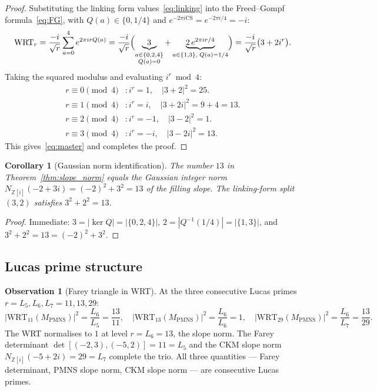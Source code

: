 \documentclass[11pt,a4paper]{article}
\newtheorem{corollary}[theorem]{Corollary}
\theoremstyle{definition}
\newtheorem{observation}[theorem]{Observation}
\newcommand{\MPMNS}{M_{\mathrm{PMNS}}}
\newcommand{\Zi}{\mathbb{Z}[i]}
\newcommand{\WRT}{\mathrm{WRT}}
\newcommand{\CS}{\mathrm{CS}}
\begin{document}
\begin{proof}
Substituting the linking form values~\eqref{eq:linking} into the
Freed--Gompf formula~\eqref{eq:FG}, with $Q(a) \in \{0, 1/4\}$ and
$e^{-2\pi i \CS} = e^{-2\pi i/4} = -i$:
\begin{equation*}
\WRT_r
= \frac{-i}{\sqrt{r}}\sum_{a=0}^{4} e^{2\pi i r Q(a)}
= \frac{-i}{\sqrt{r}}\Bigl(
  \underbrace{3}_{\substack{a \in \{0,2,4\}\\Q(a)=0}}
  +\underbrace{2\,e^{2\pi i r/4}}_{a \in \{1,3\},\;Q(a)=1/4}\Bigr)
= \frac{-i}{\sqrt{r}}\bigl(3 + 2i^r\bigr).
\end{equation*}
Taking the squared modulus and evaluating $i^r \bmod 4$:
\begin{align*}
r \equiv 0\pmod{4} &: i^r=1,\quad |3+2|^2=25.\\
r \equiv 1\pmod{4} &: i^r=i,\quad |3+2i|^2=9+4=13.\\
r \equiv 2\pmod{4} &: i^r=-1,\quad|3-2|^2=1.\\
r \equiv 3\pmod{4} &: i^r=-i,\quad|3-2i|^2=13.
\end{align*}
This gives~\eqref{eq:master} and completes the proof.
\end{proof}

\begin{corollary}[Gaussian norm identification]
\label{cor:gaussian}
The number $13$ in Theorem~\ref{thm:slope_norm} equals the Gaussian integer
norm $N_{\Zi}(-2+3i) = (-2)^2+3^2 = 13$ of the filling slope.
The linking-form split $(3,2)$ satisfies $3^2+2^2 = 13$.
\end{corollary}

\begin{proof}
Immediate: $3 = |\ker Q| = |\{0,2,4\}|$, $2 = |Q^{-1}(1/4)| = |\{1,3\}|$,
and $3^2+2^2=13 = (-2)^2+3^2$.
\end{proof}

\subsection{Lucas prime structure}

\begin{observation}[Farey triangle in WRT]
\label{obs:lucas}
At the three consecutive Lucas primes $r = L_5, L_6, L_7 = 11, 13, 29$:
\begin{equation}
|\WRT_{11}(\MPMNS)|^2 = \frac{L_6}{L_5} = \frac{13}{11},\quad
|\WRT_{13}(\MPMNS)|^2 = \frac{L_6}{L_6} = 1,\quad
|\WRT_{29}(\MPMNS)|^2 = \frac{L_6}{L_7} = \frac{13}{29}.
\end{equation}
The WRT normalises to $1$ at level $r = L_6 = 13$, the slope norm.
The Farey determinant $\det[(-2,3),(-5,2)] = 11 = L_5$
and the CKM slope norm $N_{\Zi}(-5+2i) = 29 = L_7$
complete the trio.
All three quantities --- Farey determinant, PMNS slope norm,
CKM slope norm --- are consecutive Lucas primes.
\end{observation}
\end{document}

